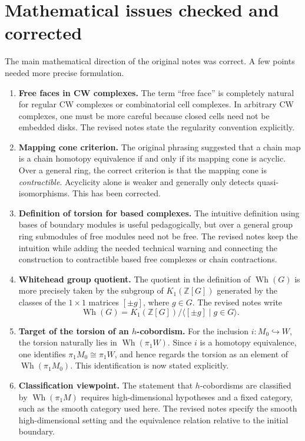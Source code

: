\documentclass[11pt,a4paper]{article}
\newcommand{\Wh}{\operatorname{Wh}}
\newcommand{\ZZ}{\mathbb{Z}}
\theoremstyle{definition}
\theoremstyle{plain}
\theoremstyle{remark}
\begin{document}
\section*{Mathematical issues checked and corrected}

The main mathematical direction of the original notes was correct. A few points needed more precise formulation.

\begin{enumerate}
  \item \textbf{Free faces in CW complexes.} The term ``free face'' is completely natural for regular CW complexes or combinatorial cell complexes. In arbitrary CW complexes, one must be more careful because closed cells need not be embedded disks. The revised notes state the regularity convention explicitly.

  \item \textbf{Mapping cone criterion.} The original phrasing suggested that a chain map is a chain homotopy equivalence if and only if its mapping cone is acyclic. Over a general ring, the correct criterion is that the mapping cone is \emph{contractible}. Acyclicity alone is weaker and generally only detects quasi-isomorphisms. This has been corrected.

  \item \textbf{Definition of torsion for based complexes.} The intuitive definition using bases of boundary modules is useful pedagogically, but over a general group ring submodules of free modules need not be free. The revised notes keep the intuition while adding the needed technical warning and connecting the construction to contractible based free complexes or chain contractions.

  \item \textbf{Whitehead group quotient.} The quotient in the definition of \(\Wh(G)\) is more precisely taken by the subgroup of \(K_1(\ZZ[G])\) generated by the classes of the \(1\times1\) matrices \([\pm g]\), where \(g\in G\). The revised notes write
  \[
    \Wh(G)=K_1(\ZZ[G])\big/\langle [\pm g]\mid g\in G\rangle.
  \]

  \item \textbf{Target of the torsion of an \(h\)-cobordism.} For the inclusion \(i:M_0\hookrightarrow W\), the torsion naturally lies in \(\Wh(\pi_1W)\). Since \(i\) is a homotopy equivalence, one identifies \(\pi_1M_0\cong\pi_1W\), and hence regards the torsion as an element of \(\Wh(\pi_1M_0)\). This identification is now stated explicitly.

  \item \textbf{Classification viewpoint.} The statement that \(h\)-cobordisms are classified by \(\Wh(\pi_1M)\) requires high-dimensional hypotheses and a fixed category, such as the smooth category used here. The revised notes specify the smooth high-dimensional setting and the equivalence relation relative to the initial boundary.
\end{enumerate}
\end{document}
